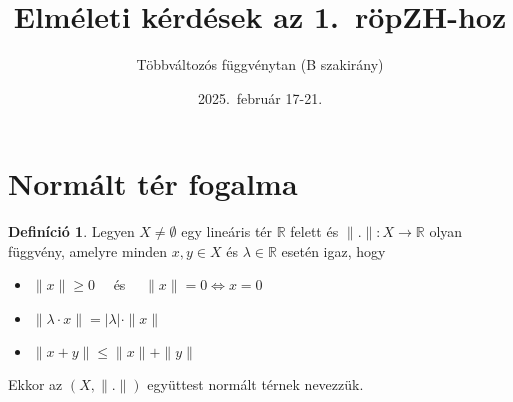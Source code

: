 \documentclass{article}
\title{Elméleti kérdések az 1.\ röpZH-hoz}
\author{Többváltozós függvénytan (B szakirány)}
\date{2025.\ február 17-21.}
\theoremstyle{definition}
\newtheorem*{definition*}{Definíció}
\begin{document}
\maketitle
\tableofcontents
\goodbreak
\section{Normált tér fogalma}
\begin{definition*}
	Legyen $X \neq \emptyset$ egy lineáris tér $\mathbb{R}$ felett és
	$\| . \|: X \to \mathbb{R}$ olyan függvény,
	amelyre minden $x, y \in X$ és $\lambda \in \mathbb{R}$ esetén igaz, hogy
	\begin{itemize}
		\item $\| x \| \geq 0 \quad$ és $\quad \| x \| = 0 \iff x = 0$
		\item $\| \lambda \cdot x \| = |\lambda| \cdot \| x \|$
		\item $\| x + y \| \leq \| x \| + \| y \|$
	\end{itemize}
	Ekkor az $(X, \| . \|)$ együttest normált térnek nevezzük.
\end{definition*}
\end{document}
